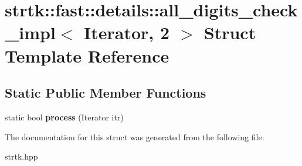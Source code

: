 \hypertarget{structstrtk_1_1fast_1_1details_1_1all__digits__check__impl_3_01Iterator_00_012_01_4}{\section{strtk\-:\-:fast\-:\-:details\-:\-:all\-\_\-digits\-\_\-check\-\_\-impl$<$ Iterator, 2 $>$ Struct Template Reference}
\label{structstrtk_1_1fast_1_1details_1_1all__digits__check__impl_3_01Iterator_00_012_01_4}
}
\subsection*{Static Public Member Functions}
\begin{DoxyCompactItemize}
\item 
\hypertarget{structstrtk_1_1fast_1_1details_1_1all__digits__check__impl_3_01Iterator_00_012_01_4_a4cdef6c7c86d867239451020472ce5ee}{static bool {\bfseries process} (Iterator itr)}\label{structstrtk_1_1fast_1_1details_1_1all__digits__check__impl_3_01Iterator_00_012_01_4_a4cdef6c7c86d867239451020472ce5ee}

\end{DoxyCompactItemize}


The documentation for this struct was generated from the following file\-:\begin{DoxyCompactItemize}
\item 
strtk.\-hpp\end{DoxyCompactItemize}
